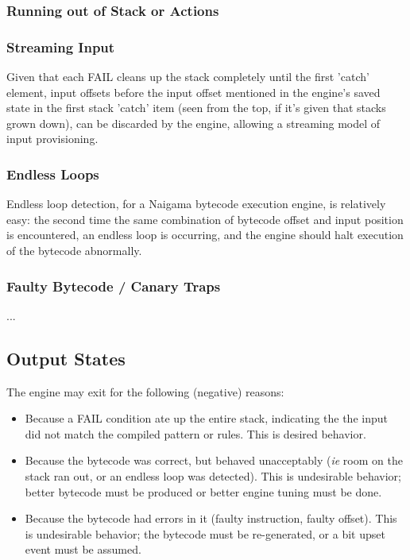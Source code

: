 \subsubsection{Running out of Stack or Actions}

\subsubsection{Streaming Input}

Given that each FAIL cleans up the stack completely until the first
'catch' element, input offsets before the input offset mentioned in the
engine's saved state in the first stack 'catch' item (seen from the top,
if it's given that stacks grown down), can be discarded by the engine,
allowing a streaming model of input provisioning.

\subsubsection{Endless Loops}

Endless loop detection, for a Naigama bytecode execution engine, is
relatively easy: the second time the same combination of bytecode offset
and input position is encountered, an endless loop is occurring, and the
engine should halt execution of the bytecode abnormally.

\subsubsection{Faulty Bytecode / Canary Traps}

...

\subsection{Output States}

The engine may exit for the following (negative) reasons:

\begin{itemize}

\item Because a FAIL condition ate up the entire stack, indicating
the the input did not match the compiled pattern or rules.
This is desired behavior.

\item Because the bytecode was correct, but behaved unacceptably
(\textit{ie} room on the stack ran out, or an endless loop was detected).
This is undesirable behavior; better bytecode must be produced
or better engine tuning must be done.

\item Because the bytecode had errors in it
(faulty instruction, faulty offset). This is undesirable behavior;
the bytecode must be re-generated, or a bit upset event must be assumed.

\end{itemize}

